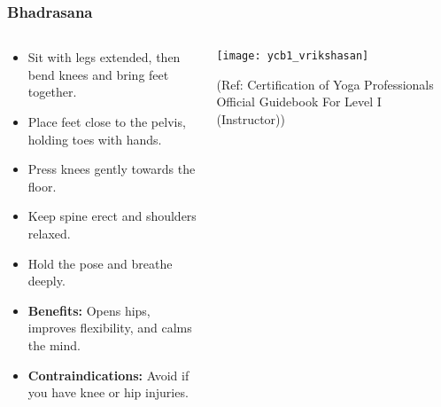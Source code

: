 \begin{frame}[fragile]\frametitle{Bhadrasana}
\begin{columns}
    \begin{column}[T]{0.5\linewidth}
      \begin{itemize}
        \item Sit with legs extended, then bend knees and bring feet together.
        \item Place feet close to the pelvis, holding toes with hands.
        \item Press knees gently towards the floor.
        \item Keep spine erect and shoulders relaxed.
        \item Hold the pose and breathe deeply.
        \item \textbf{Benefits:} Opens hips, improves flexibility, and calms the mind.
        \item \textbf{Contraindications:} Avoid if you have knee or hip injuries.
      \end{itemize}
    \end{column}
    \begin{column}[T]{0.5\linewidth}
        \begin{center}
        \begin{center}
		        \texttt{[image: ycb1\_vrikshasan]}
				
				{\tiny (Ref: Certification  of Yoga Professionals Official Guidebook For Level I (Instructor))}	        
		\end{center}   
        \end{center}    
    \end{column}
  \end{columns}
\end{frame}

